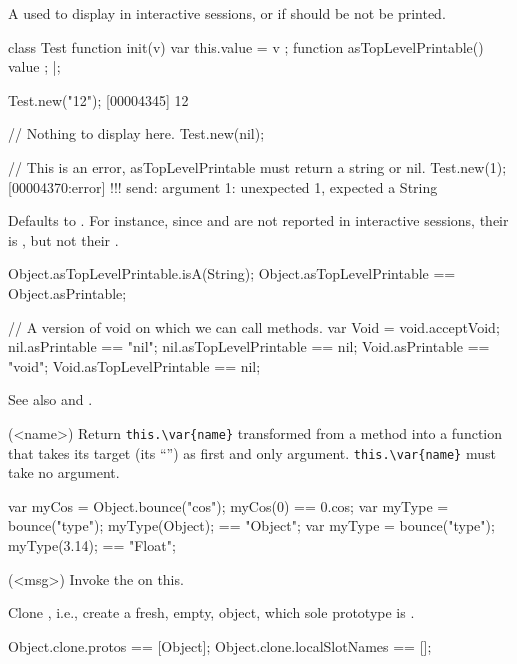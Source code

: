 \begin{urbiscriptapi}
\item[asTopLevelPrintable]%
  A  used to display \this in interactive sessions, or
   if \this should be not be printed.
\begin{urbiscript}
class Test
{
  function init(v) { var this.value = v };
  function asTopLevelPrintable() { value };
}|;

Test.new("12");
[00004345] 12

// Nothing to display here.
Test.new(nil);

// This is an error, asTopLevelPrintable must return a string or nil.
Test.new(1);
[00004370:error] !!! send: argument 1: unexpected 1, expected a String
\end{urbiscript}

  Defaults to .  For instance, since 
  and  are not reported in interactive sessions, their
   is , but not their
  .
\begin{urbiassert}
Object.asTopLevelPrintable.isA(String);
Object.asTopLevelPrintable == Object.asPrintable;

// A version of void on which we can call methods.
var Void = void.acceptVoid;
 nil.asPrintable == "nil";   nil.asTopLevelPrintable == nil;
Void.asPrintable == "void"; Void.asTopLevelPrintable == nil;
\end{urbiassert}

  See also  and .

\item[bounce](<name>)%
  Return \lstinline|this.\var{name}| transformed from a method into a
  function that takes its target (its ``\this'') as first
  and only argument.  \lstinline|this.\var{name}| must take no
  argument.
\begin{urbiassert}
{ var myCos = Object.bounce("cos"); myCos(0) }   == 0.cos;
{ var myType = bounce("type"); myType(Object); } == "Object";
{ var myType = bounce("type"); myType(3.14); }   == "Float";
\end{urbiassert}

\item[callMessage](<msg>)%
  Invoke the   on this.
\item[clone]
  Clone \this, i.e., create a fresh, empty, object, which
  sole prototype is \this.
\begin{urbiassert}
Object.clone.protos == [Object];
Object.clone.localSlotNames == [];
\end{urbiassert}


\end{urbiscriptapi}
